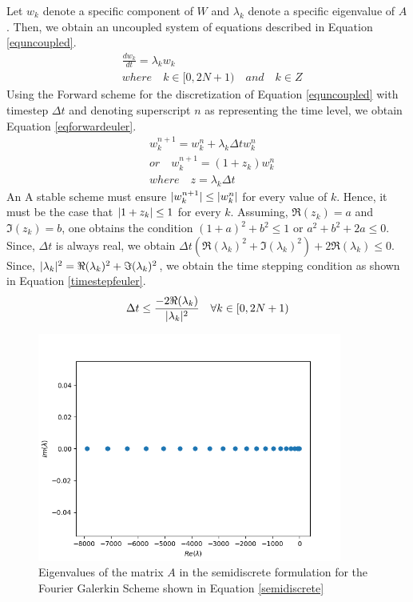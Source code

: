 \documentclass[12pt]{article}
\DeclarePairedDelimiter\abs{\lvert}{\rvert}
\begin{document}
Let $w_k$ denote a specific component of $W$ and $\lambda_k$ denote a specific eigenvalue of $A$. Then, we obtain an uncoupled system of equations described in Equation \ref{equncoupled}.
\begin{equation}
\begin{aligned}
    & \frac{dw_k}{dt} = \lambda_k w_k \\
    & where \quad k \in [0, 2N + 1) \quad and \quad k \in Z
\end{aligned}
    \label{equncoupled}
\end{equation}
Using the Forward scheme for the discretization of Equation \ref{equncoupled} with timestep $\Delta t$ and denoting superscript $n$ as representing the time level, we obtain Equation \ref{eqforwardeuler}.
\begin{equation}
    \begin{aligned}
       & w_k^{n + 1} = w_k^{n} + \lambda_k \Delta t w_k^n \\
       & or \quad w_k^{n + 1} = (1 + z_k) w_k^{n} \\
       & where \quad z = \lambda_k \Delta t
    \end{aligned}
\label{eqforwardeuler}
\end{equation}
An A stable scheme must ensure $\abs{ w_k^{n + 1} } \leq \abs{ w_k^n }$ for every value of $k$. Hence, it must be the case that $\abs{1 + z_k} \leq 1$ for every $k$. Assuming, $\Re(z_k) = a$ and $\Im(z_k) = b$, one obtains the condition $(1 + a)^2 + b^2 \leq 1$ or $a^2 + b^2 + 2a \leq 0$. Since, $\Delta t$ is always real, we obtain $\Delta t( \Re(\lambda_k)^2 + \Im(\lambda_k)^2  ) + 2 \Re(\lambda_k) \leq 0$. Since, $\abs{\lambda_k}^2 = \Re(\lambda_k)^2 + \Im(\lambda_k)^2$, we obtain the time stepping condition as shown in Equation \ref{timestepfeuler}.
\begin{equation}
    \Delta t \leq \frac{-2 \Re(\lambda_k)}{\abs{\lambda_k}^2} \quad \forall k \in [0, 2N + 1)
    \label{timestepfeuler}
\end{equation}
\begin{figure}
    \centering
    \includegraphics[width=10cm]{eigenplot_u_Q1.png}
    \caption{Eigenvalues of the matrix $A$ in the semidiscrete formulation for the Fourier Galerkin Scheme shown in Equation \ref{semidiscrete}}
    \label{eigenplot_Q1}
\end{figure}
\end{document}

